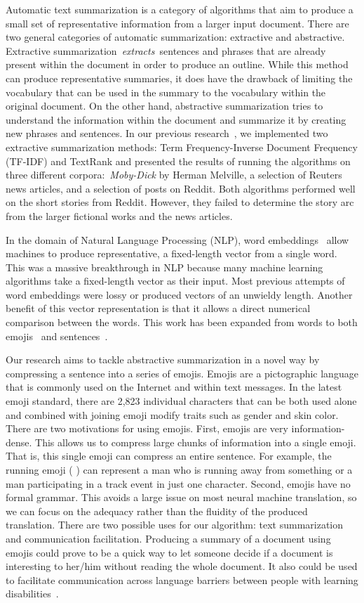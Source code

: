 \documentclass{article}[10]
\newcommand*{\img}[1]{%
  \raisebox{-.3\baselineskip}{%
    \texttt{[image: \#1]}%
  }%
}
\begin{document}
Automatic text summarization is a category of algorithms that aim to produce a small set of representative information from a larger input document. There are two general categories of automatic summarization: extractive and abstractive. Extractive summarization~\emph{extracts~}sentences and phrases that are already present within the document in order to produce an outline. While this method can produce representative summaries, it does have the drawback of limiting the vocabulary that can be used in the summary to the vocabulary within the original document. On the other hand, abstractive summarization tries to understand the information within the document and summarize it by creating new phrases and sentences. In our previous research~\cite{day_extractive}, we implemented two extractive summarization methods: Term Frequency-Inverse Document Frequency (TF-IDF) and TextRank and presented the results of running the algorithms on three different corpora:~\emph{Moby-Dick} by Herman Melville, a selection of Reuters news articles, and a selection of posts on Reddit. Both algorithms performed well on the short stories from Reddit. However, they failed to determine the story arc from the larger fictional works and the news articles.

In the domain of Natural Language Processing (NLP), word embeddings~\cite{mikolov2013efficient} allow machines to produce representative, a fixed-length vector from a single word. This was a massive breakthrough in NLP because many machine learning algorithms take a fixed-length vector as their input. Most previous attempts of word embeddings were lossy or produced vectors of an unwieldy length. Another benefit of this vector representation is that it allows a direct numerical comparison between the words. This work has been expanded from words to both emojis~\cite{Eisner_2016} and sentences~\cite{pg2017unsu}.

Our research aims to tackle abstractive summarization in a novel way by compressing a sentence into a series of emojis. Emojis are a pictographic language that is commonly used on the Internet and within text messages. In the latest emoji standard, there are 2,823 individual characters that can be both used alone and combined with joining emoji modify traits such as gender and skin color. There are two motivations for using emojis. First, emojis are very information-dense. This allows us to compress large chunks of information into a single emoji. That is, this single emoji can compress an entire sentence. For example, the running emoji (\img{emojis/1f3c3.png}) can represent a man who is running away from something or a man participating in a track event in just one character. Second, emojis have no formal grammar. This avoids a large issue on most neural machine translation, so we can focus on the adequacy rather than the fluidity of the produced translation. There are two possible uses for our algorithm: text summarization and communication facilitation. Producing a summary of a document using emojis could prove to be a quick way to let someone decide if a document is interesting to her/him without reading the whole document. It also could be used to facilitate communication across language barriers between people with learning disabilities~\cite{vandeghinste2017translating}.
\end{document}

